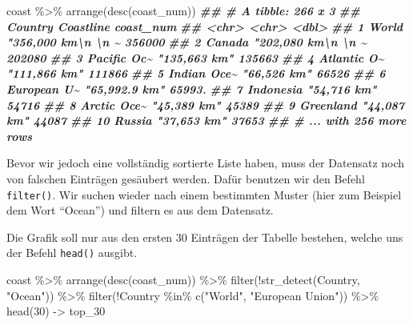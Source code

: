 \documentclass[
  ngerman,
]{article}
\newenvironment{Shaded}{\begin{snugshade}}{\end{snugshade}}
\newcommand{\DecValTok}[1]{\textcolor[rgb]{0.00,0.00,0.81}{#1}}
\newcommand{\DocumentationTok}[1]{\textcolor[rgb]{0.56,0.35,0.01}{\textbf{\textit{#1}}}}
\newcommand{\FunctionTok}[1]{\textcolor[rgb]{0.00,0.00,0.00}{#1}}
\newcommand{\NormalTok}[1]{#1}
\newcommand{\OtherTok}[1]{\textcolor[rgb]{0.56,0.35,0.01}{#1}}
\newcommand{\SpecialCharTok}[1]{\textcolor[rgb]{0.00,0.00,0.00}{#1}}
\newcommand{\StringTok}[1]{\textcolor[rgb]{0.31,0.60,0.02}{#1}}
\begin{document}
\begin{Shaded}
\begin{Highlighting}[]
\NormalTok{coast }\SpecialCharTok{\%\textgreater{}\%}
  \FunctionTok{arrange}\NormalTok{(}\FunctionTok{desc}\NormalTok{(coast\_num))}
\DocumentationTok{\#\# \# A tibble: 266 x 3}
\DocumentationTok{\#\#    Country     Coastline                      coast\_num}
\DocumentationTok{\#\#    \textless{}chr\textgreater{}       \textless{}chr\textgreater{}                              \textless{}dbl\textgreater{}}
\DocumentationTok{\#\#  1 World       "356,000 km\textbackslash{}n          \textbackslash{}n    \textasciitilde{}   356000 }
\DocumentationTok{\#\#  2 Canada      "202,080 km\textbackslash{}n          \textbackslash{}n    \textasciitilde{}   202080 }
\DocumentationTok{\#\#  3 Pacific Oc\textasciitilde{} "135,663 km"                     135663 }
\DocumentationTok{\#\#  4 Atlantic O\textasciitilde{} "111,866 km"                     111866 }
\DocumentationTok{\#\#  5 Indian Oce\textasciitilde{} "66,526 km"                       66526 }
\DocumentationTok{\#\#  6 European U\textasciitilde{} "65,992.9 km"                     65993.}
\DocumentationTok{\#\#  7 Indonesia   "54,716 km"                       54716 }
\DocumentationTok{\#\#  8 Arctic Oce\textasciitilde{} "45,389 km"                       45389 }
\DocumentationTok{\#\#  9 Greenland   "44,087 km"                       44087 }
\DocumentationTok{\#\# 10 Russia      "37,653 km"                       37653 }
\DocumentationTok{\#\# \# ... with 256 more rows}
\end{Highlighting}
\end{Shaded}

Bevor wir jedoch eine vollständig sortierte Liste haben, muss der Datensatz noch von falschen Einträgen gesäubert werden. Dafür benutzen wir den Befehl \texttt{filter()}. Wir suchen wieder nach einem bestimmten Muster (hier zum Beispiel dem Wort ``Ocean'') und filtern es aus dem Datensatz.

Die Grafik soll nur aus den ersten 30 Einträgen der Tabelle bestehen, welche uns der Befehl \texttt{head()} ausgibt.

\begin{Shaded}
\begin{Highlighting}[]
\NormalTok{coast }\SpecialCharTok{\%\textgreater{}\%}
  \FunctionTok{arrange}\NormalTok{(}\FunctionTok{desc}\NormalTok{(coast\_num)) }\SpecialCharTok{\%\textgreater{}\%}
  \FunctionTok{filter}\NormalTok{(}\SpecialCharTok{!}\FunctionTok{str\_detect}\NormalTok{(Country, }\StringTok{"Ocean"}\NormalTok{)) }\SpecialCharTok{\%\textgreater{}\%}
  \FunctionTok{filter}\NormalTok{(}\SpecialCharTok{!}\NormalTok{Country }\SpecialCharTok{\%in\%} \FunctionTok{c}\NormalTok{(}\StringTok{"World"}\NormalTok{, }\StringTok{"European Union"}\NormalTok{)) }\SpecialCharTok{\%\textgreater{}\%}
  \FunctionTok{head}\NormalTok{(}\DecValTok{30}\NormalTok{) }\OtherTok{{-}\textgreater{}}\NormalTok{ top\_30}
\end{Highlighting}
\end{Shaded}
\end{document}
